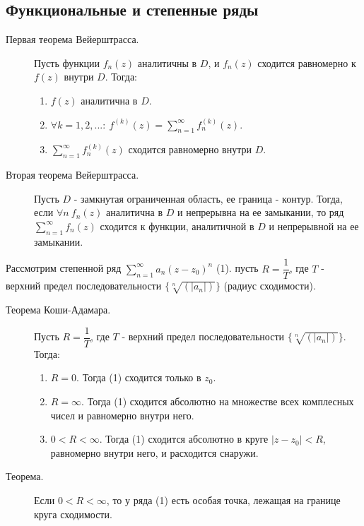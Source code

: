\documentclass[a4paper,12pt]{scrartcl}
\begin{document}
\subsection{Функциональные и степенные ряды}
\begin{description}
 \item[Первая теорема Вейерштрасса.] Пусть функции $f_n(z)$ аналитичны в $D$, и $f_n(z)$ сходится равномерно к $f(z)$ внутри $D$. Тогда:
\begin{enumerate}
 \item $f(z)$ аналитична в $D$.
 \item $\forall k=1,2,...:\ f^{(k)}(z) = \sum\limits_{n=1}^{\infty}f_n^{(k)}(z)$.
 \item $\sum\limits_{n=1}^{\infty}f_n^{(k)}(z)$ сходится равномерно внутри $D$.
\end{enumerate}

 \item[Вторая теорема Вейерштрасса.] Пусть $D$ - замкнутая ограниченная область, ее граница - контур. Тогда, если $\forall n \ f_n(z)$ аналитична в $D$ и непрерывна на ее замыкании, то ряд $\sum\limits_{n=1}^{\infty}f_n(z)$ сходится к функции, аналитичной в $D$  и непрерывной на ее замыкании. 
\end{description}

Рассмотрим степенной ряд $\sum\limits_{n=1}^{\infty}a_n(z-z_0)^n $ (1). пусть $R = \dfrac{1}{T}$, где $T$ - верхний предел последовательности $\{\sqrt[n]{(|a_n|)}\}$ (радиус сходимости).

\begin{description}
 \item[Теорема Коши-Адамара.] Пусть $R = \dfrac{1}{T}$, где $T$ - верхний предел последовательности $\{\sqrt[n]{(|a_n|)}\}$. Тогда:
\begin{enumerate}
 \item $R =0.$ Тогда (1) сходится только в $z_0$.
 \item $R=\infty$. Тогда (1) сходится абсолютно на множестве всех комплесных чисел и равномерно внутри него.
 \item $0 < R <\infty$. Тогда (1) сходится абсолютно в круге $|z-z_0| < R$, равномерно внутри него, и расходится снаружи.
\end{enumerate}

 \item[Теорема.] Если $0 < R <\infty$, то у ряда (1) есть особая точка, лежащая на границе круга сходимости.
\end{description}
\end{document}
